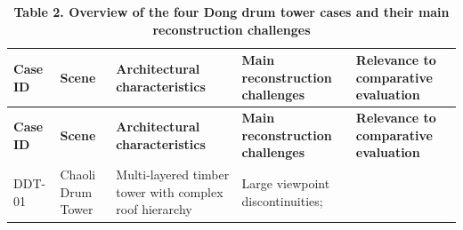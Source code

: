 \begin{longtable}[]{@{}
  >{\centering\arraybackslash}p{}
  >{\centering\arraybackslash}p{}
  >{\centering\arraybackslash}p{}
  >{\centering\arraybackslash}p{}
  >{\centering\arraybackslash}p{}@{}}
\caption{\textbf{Table 2. Overview of the four Dong drum tower cases
and their main reconstruction challenges}}\tabularnewline
\toprule\noalign{}
\begin{minipage}[b]{\linewidth}\centering
\textbf{Case ID}
\end{minipage} & \begin{minipage}[b]{\linewidth}\centering
\textbf{Scene}
\end{minipage} & \begin{minipage}[b]{\linewidth}\centering
\textbf{Architectural characteristics}
\end{minipage} & \begin{minipage}[b]{\linewidth}\centering
\textbf{Main reconstruction challenges}
\end{minipage} & \begin{minipage}[b]{\linewidth}\centering
\textbf{Relevance to comparative evaluation}
\end{minipage} \\
\midrule\noalign{}
\endfirsthead
\toprule\noalign{}
\begin{minipage}[b]{\linewidth}\centering
\textbf{Case ID}
\end{minipage} & \begin{minipage}[b]{\linewidth}\centering
\textbf{Scene}
\end{minipage} & \begin{minipage}[b]{\linewidth}\centering
\textbf{Architectural characteristics}
\end{minipage} & \begin{minipage}[b]{\linewidth}\centering
\textbf{Main reconstruction challenges}
\end{minipage} & \begin{minipage}[b]{\linewidth}\centering
\textbf{Relevance to comparative evaluation}
\end{minipage} \\
\midrule\noalign{}
\endhead
\bottomrule\noalign{}
\endlastfoot
DDT-01 & Chaoli Drum Tower & Multi-layered timber tower
with complex roof hierarchy & Large viewpoint discontinuities;

\end{longtable}
